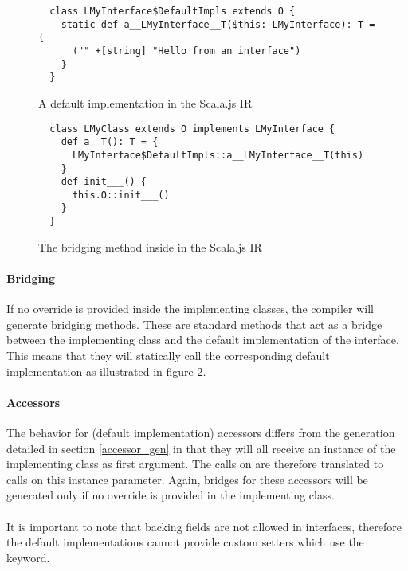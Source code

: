 \begin{figure}[h]
  \begin{verbatim}
  class LMyInterface$DefaultImpls extends O {
    static def a__LMyInterface__T($this: LMyInterface): T = {
      ("" +[string] "Hello from an interface")
    }
  }
  \end{verbatim}
  \caption{A default implementation in the Scala.js IR}
  \label{interface_default}
\end{figure}



\begin{figure}[h]
  \begin{verbatim}
  class LMyClass extends O implements LMyInterface {
    def a__T(): T = {
      LMyInterface$DefaultImpls::a__LMyInterface__T(this)
    }
    def init___() {
      this.O::init___()
    }
  }
  \end{verbatim}
  \caption{The bridging method inside  in the Scala.js IR}
  \label{implementing_class}
\end{figure}


\paragraph{Bridging} If no override is provided inside the implementing classes, the compiler will 
generate bridging methods. These are standard methods that act as a bridge between the implementing 
class and the default implementation of the interface. This means that they will statically call 
the corresponding default implementation as illustrated in figure \ref{implementing_class}.

\paragraph{Accessors} The behavior for (default implementation) accessors differs from the 
generation detailed in section \ref{accessor_gen} in that they will all receive an instance of the 
implementing class as first argument. The calls on  are therefore translated to calls 
on this instance parameter. Again, bridges for these accessors will be generated only if no 
override is provided in the implementing class.

\paragraph{} It is important to note that backing fields are not allowed in interfaces, therefore 
the default implementations cannot provide custom setters which use the  keyword.

